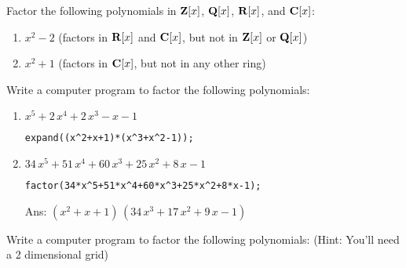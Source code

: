 \begin{comment}

\mysection{Axiom Soup}

At this point, the reader might begin to suspect that we build up a
theory from our axioms, and whenever we get stuck, we introduce a new
axiom so that we can move forward!  In a sense, this is true, but
don't miss an important point.  While the axioms are axioms in the
sense that you can't prove U1 or I1 for an arbitrary ring (i.e, just
given the R axioms), they are also theorems in the sense that we can
prove them for the particular systems of interest to us.  We prove the
axioms both for our base system ${\bf Z}$ (the integers form a unique
factorization domain), and for any constructed system ${\cal F}[x]$ (a
polynomial ring in a single {\it transcendental} variable over a field
is also a unique factorization domain).

Let me close this chapter by proving this in a series of theorems.

\end{comment}

\vfill\eject
{}

Factor the following polynomials in ${\bf Z}[x]$, ${\bf Q}[x]$, ${\bf R}[x]$, and ${\bf C}[x]$:

\begin{enumerate}
\item $x^2-2$  (factors in ${\bf R}[x]$ and ${\bf C}[x]$, but not in ${\bf Z}[x]$ or ${\bf Q}[x]$)
\item $x^2+1$  (factors in ${\bf C}[x]$, but not in any other ring)
\end{enumerate}

Write a computer program to factor the following polynomials:

\begin{enumerate}[resume]
\item $x^5+2\,x^4+2\,x^3-x-1$

\lstinline!expand((x^2+x+1)*(x^3+x^2-1));!

\item $34\,x^5+51\,x^4+60\,x^3+25\,x^2+8\,x-1$

\lstinline!factor(34*x^5+51*x^4+60*x^3+25*x^2+8*x-1);!

Ans: $\left(x^2+x+1\right)\,\left(34\,x^3+17\,x^2+9\,x-1\right)$


\end{enumerate}

Write a computer program to factor the following polynomials:\hfil\break
\-\hspace{1cm} (Hint: You'll need a 2 dimensional grid)

